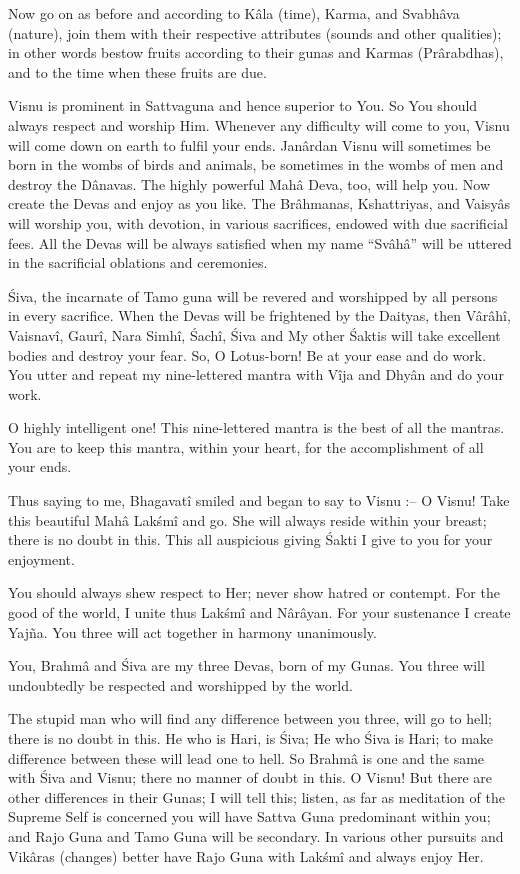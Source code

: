 Now go on as before and according to K\^ala (time), Karma, and Svabh\^ava (nature), join them with their respective attributes (sounds and other qualities); in other words bestow fruits according to their gunas and Karmas (Pr\^arabdhas), and to the time when these fruits are due.

Visnu is prominent in Sattvaguna and hence superior to You. So You should always respect and worship Him. Whenever any difficulty will come to you, Visnu will come down on earth to fulfil your ends. Jan\^ardan Visnu will sometimes be born in the wombs of birds and animals, be sometimes in the wombs of men and destroy the D\^anavas. The highly powerful Mah\^a Deva, too, will help you. Now create the Devas and enjoy as you like. The Br\^ahmanas, Kshattriyas, and Vaisy\^as will worship you, with devotion, in various sacrifices, endowed with due sacrificial fees. All the Devas will be always satisfied when my name ``Sv\^ah\^a'' will be uttered in the sacrificial oblations and ceremonies.

\'Siva, the incarnate of Tamo guna will be revered and worshipped by all persons in every sacrifice. When the Devas will be frightened by the Daityas, then V\^ar\^ah\^i, Vaisnav\^i, Gaur\^i, Nara Simh\^i, \'Sach\^i, \'Siva and My other \'Saktis will take excellent bodies and destroy your fear. So, O Lotus-born! Be at your ease and do work. You utter and repeat my nine-lettered mantra with V\^ija and Dhy\^an and do your work.

O highly intelligent one! This nine-lettered mantra is the best of all the mantras. You are to keep this mantra, within your heart, for the accomplishment of all your ends.

Thus saying to me, Bhagavat\^i smiled and began to say to Visnu :-- O Visnu! Take this beautiful Mah\^a Lak\'sm\^i and go. She will always reside within your breast; there is no doubt in this. This all auspicious giving \'Sakti I give to you for your enjoyment.

You should always shew respect to Her; never show hatred or contempt. For the good of the world, I unite thus Lak\'sm\^i and N\^ar\^ayan. For your sustenance I create Yaj\~na. You three will act together in harmony unanimously.

You, Brahm\^a and \'Siva are my three Devas, born of my Gunas. You three will undoubtedly be respected and worshipped by the world.

The stupid man who will find any difference between you three, will go to hell; there is no doubt in this. He who is Hari, is \'Siva; He who \'Siva is Hari; to make difference between these will lead one to hell. So Brahm\^a is one and the same with \'Siva and Visnu; there no manner of doubt in this. O Visnu! But there are other differences in their Gunas; I will tell this; listen, as far as meditation of the Supreme Self is concerned you will have Sattva Guna predominant within you; and Rajo Guna and Tamo Guna will be secondary. In various other pursuits and Vik\^aras (changes) better have Rajo Guna with Lak\'sm\^i and always enjoy Her.

